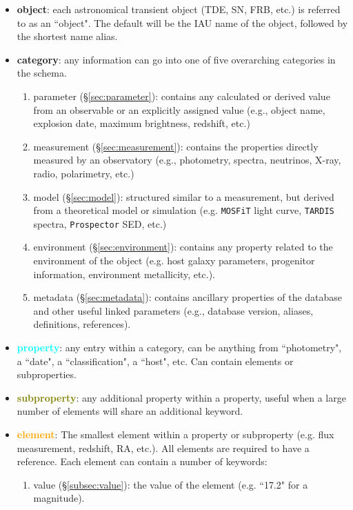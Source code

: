 \documentclass[tighten]{aastex631}
\newcommand{\property}[1]{\textcolor{cyan}{#1}}
\newcommand{\subproperty}[1]{\textcolor{olive}{#1}}
\newcommand{\element}[1]{\textcolor{orange}{#1}}
\begin{document}
\begin{itemize}
    \item \textbf{object}: each astronomical transient object (TDE, SN, FRB, etc.) is referred to as an ``object". The default will be the IAU name of the object, followed by the shortest name alias.
    \item \textbf{category}: any information can go into one of five overarching categories in the schema.
        \begin{enumerate}
            \item parameter (\S\ref{sec:parameter}): contains any calculated or derived value from an observable or an explicitly assigned value (e.g., object name, explosion date, maximum brightness, redshift, etc.)
            \item measurement (\S\ref{sec:measurement}): contains the properties directly measured by an observatory (e.g., photometry, spectra, neutrinos, X-ray, radio, polarimetry, etc.)
            \item model (\S\ref{sec:model}): structured similar to a measurement, but derived from a theoretical model or simulation (e.g. {\tt MOSFiT} light curve, {\tt TARDIS} spectra, {\tt Prospector} SED, etc.)
            \item environment (\S\ref{sec:environment}): contains any property related to the environment of the object (e.g. host galaxy parameters, progenitor information, environment metallicity, etc.).
            \item metadata (\S\ref{sec:metadata}): contains ancillary properties of the database and other useful linked parameters (e.g., database version, aliases, definitions, references).
        \end{enumerate}
    \item \textbf{\property{property}}: any entry within a category, can be anything from ``photometry", a ``date", a ``classification", a ``host", etc. Can contain elements or subproperties. 
    \item \textbf{\subproperty{subproperty}}: any additional property within a property, useful when a large number of elements will share an additional keyword.
    \item \textbf{\element{element}}: The smallest element within a property or subproperty (e.g. flux measurement, redshift, RA, etc.). All elements are required to have a reference. Each element can contain a number of keywords:
    \begin{enumerate}
        \item value (\S\ref{subsec:value}): the value of the element (e.g. ``17.2" for a magnitude).

\end{enumerate}
\end{itemize}
\end{document}
